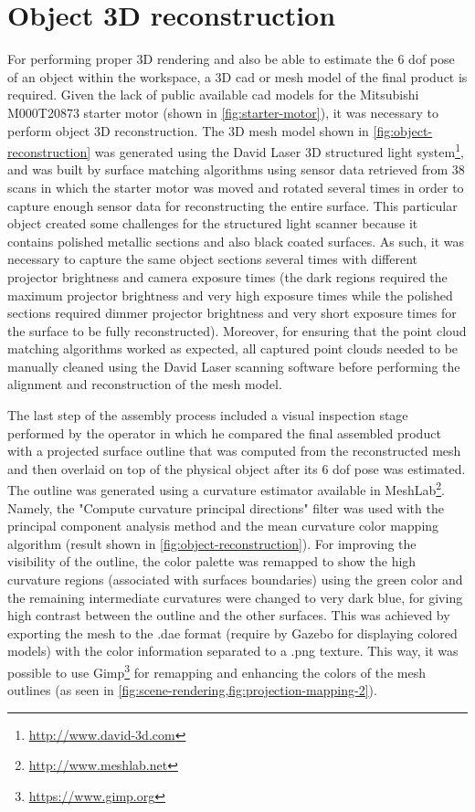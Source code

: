 \section{Object 3D reconstruction}\label{sec:object-reconstruction}

For performing proper 3D rendering and also be able to estimate the 6 \gls{dof} pose of an object within the workspace, a 3D \gls{cad} or mesh model of the final product is required. Given the lack of public available \gls{cad} models for the Mitsubishi M000T20873 starter motor (shown in \cref{fig:starter-motor}), it was necessary to perform object 3D reconstruction. The 3D mesh model shown in \cref{fig:object-reconstruction} was generated using the David Laser 3D structured light system\footnote{\url{http://www.david-3d.com}}, and was built by surface matching algorithms using sensor data retrieved from 38 scans in which the starter motor was moved and rotated several times in order to capture enough sensor data for reconstructing the entire surface. This particular object created some challenges for the structured light scanner because it contains polished metallic sections and also black coated surfaces. As such, it was necessary to capture the same object sections several times with different projector brightness and camera exposure times (the dark regions required the maximum projector brightness and very high exposure times while the polished sections required dimmer projector brightness and very short exposure times for the surface to be fully reconstructed). Moreover, for ensuring that the point cloud matching algorithms worked as expected, all captured point clouds needed to be manually cleaned using the David Laser scanning software before performing the alignment and reconstruction of the mesh model.

The last step of the assembly process included a visual inspection stage performed by the operator in which he compared the final assembled product with a projected surface outline that was computed from the reconstructed mesh and then overlaid on top of the physical object after its 6 \gls{dof} pose was estimated. The outline was generated using a curvature estimator available in MeshLab\footnote{\url{http://www.meshlab.net}}. Namely, the "Compute curvature principal directions" filter was used with the principal component analysis method and the mean curvature color mapping algorithm (result shown in \cref{fig:object-reconstruction}). For improving the visibility of the outline, the color palette was remapped to show the high curvature regions (associated with surfaces boundaries) using the green color and the remaining intermediate curvatures were changed to very dark blue, for giving high contrast between the outline and the other surfaces. This was achieved by exporting the mesh to the .dae format (require by Gazebo for displaying colored models) with the color information separated to a .png texture. This way, it was possible to use Gimp\footnote{\url{https://www.gimp.org}} for remapping and enhancing the colors of the mesh outlines (as seen in \cref{fig:scene-rendering,fig:projection-mapping-2}).

